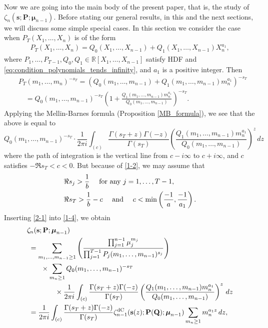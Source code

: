\documentclass[a4paper,12pt]{article}
\theoremstyle{definition}
\numberwithin{equation}{section}
\newcommand{\dc}{\mathrm{dC}}
\newcommand{\dd}{d}
\newcommand{\ii}{i}
\begin{document}
Now we are going into the main body of the present paper, that is, the study of $\zeta_n(\mathbf{s};\mathbf{P};\boldsymbol{\mu}_{n-1})$.    Before stating our general results, in this and the next sections, we will discuss some simple special cases.
In this section we consider the case when $P_T(X_1,\ldots,X_n)$ is of the form
\begin{align}\label{P_t_form1}
P_T(X_1,\ldots,X_n)=Q_0(X_1,\ldots,X_{n-1})+Q_1(X_1,\ldots,X_{n-1})X_n^{a_1},
\end{align}
where
$P_1,\ldots, P_{T-1}, Q_0,Q_1\in \mathbb{R}[X_1,\ldots,X_{n-1}]$ satisfy HDF and \eqref{eq:condition_polynomials_tends_infinity}, and $a_1$ is a positive integer. 
Then
\begin{align*}
&P_T(m_1,\ldots,m_n)^{-s_T}=
(Q_0(m_1,\ldots,m_{n-1})+Q_1(m_1,\ldots,m_{n-1})m_n^{a_1})^{-s_T}\\
&\quad =Q_0(m_1,\ldots,m_{n-1})^{-s_T}\left(1+
\frac{Q_1(m_1,\ldots,m_{n-1})m_n^{a_1}}{Q_0(m_1,\ldots,m_{n-1})}\right)^{-s_T}.
\end{align*}
Applying the Mellin-Barnes formula (Proposition \ref{MB_formula}), we see that the above is equal to
\begin{equation}\label{2-1}
Q_0(m_1,\ldots,m_{n-1})^{-s_T}\cdot \frac{1}{2\pi \ii}\int_{(c)}
\frac{\Gamma(s_T+z)\Gamma(-z)}{\Gamma(s_T)} \left(\frac{Q_1(m_1,\ldots,m_{n-1})m_n^{a_1}}{Q_0(m_1,\ldots,m_{n-1})}
\right)^z \, \dd z
\end{equation}
where the path of integration is the vertical line from $c-i\infty$ to
$c+i\infty$, and $c$ satisfies $-\Re s_T<c<0$.
But because of \eqref{1-2}, we may assume that
\begin{align}\label{2-2}
&\Re s_j >\frac{1}{b} \quad \text{ for any } j=1,\ldots, T-1,\notag\\
&\Re s_T >\frac{1}{b}-c \quad \text{ and } \quad c< \min\left(\frac{-1}{a}, \frac{-1}{a_1}\right).
\end{align}
Inserting \eqref{2-1} into \eqref{1-4}, we obtain
\begin{align}\label{2-3}
&\zeta_n(\mathbf{s};\mathbf{P};\boldsymbol{\mu}_{n-1})\notag\\
&\;=\sum_{m_1,\ldots,m_{n-1}\geq 1}
\left(\frac{\prod_{j=1}^{n-1}\mu_j^{m_j}}{\prod_{j=1}^{T-1}P_j(m_1,\ldots,m_{n-1})^{s_j}}\right)\notag\\
&\qquad \times\sum_{m_n\geq 1}
Q_0(m_1,\ldots,m_{n-1})^{-s_T} \notag\\
&\qquad \qquad \times \frac{1}{2\pi \ii}\int_{(c)}
\frac{\Gamma(s_T+z)\Gamma(-z)}{\Gamma(s_T)} \left(\frac{Q_1(m_1,\ldots,m_{n-1})m_n^{a_1}}{Q_0(m_1,\ldots,m_{n-1})}
\right)^z \, \dd z\notag\\
&\;=\frac{1}{2\pi \ii}\int_{(c)}
\frac{\Gamma(s_T+z)\Gamma(-z)}{\Gamma(s_T)}
\zeta_{n-1}^{\dc}(\mathbf{s}(z);\mathbf{P(Q)};\boldsymbol{\mu}_{n-1})\sum_{m_n\geq 1}m_n^{a_1 z} \, \dd z,
\end{align}
\end{document}
